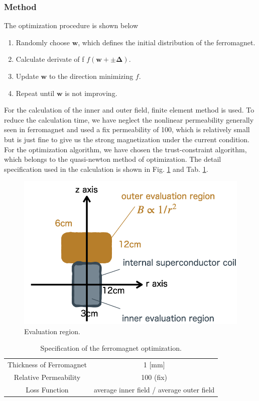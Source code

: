 \subsubsection{Method}
The optimization procedure is shown below
\begin{enumerate}
  \item Randomly choose $\mathbf{w}$, which defines the initial distribution of the ferromagnet.
  \item Calculate derivate of f $f(\mathbf{w+\pm \Delta})$.
  \item Update $\mathbf{w}$ to the direction minimizing $f$.
  \item Repeat until $\mathbf{w}$ is not improving.
\end{enumerate}
For the calculation of the inner and outer field,
finite element method is used.
To reduce the calculation time, we have neglect the nonlinear permeability generally seen in ferromagnet
and used a fix permeability of 100,
which is relatively small but is just fine to give us the strong magnetization under the current condition.
For the optimization algorithm, we have chosen the trust-constraint algorithm,
which belongs to the quasi-newton method of optimization.
The detail specification used in the calculation is shown in Fig. \ref{fig:FMEvaluationRegion} and Tab. \ref{tab:FMSpecification}.
\begin{figure}[H]
  \includegraphics[width=18cm, bb=9 9 900 600]{./section4Optimal/evaluationRegion.png}
  \caption{Evaluation region.}
  \label{fig:FMEvaluationRegion}
\end{figure}
\begin{table}[H]
  \centering
  \caption{Specification of the ferromagnet optimization.}
  \label{tab:FMSpecification}
  \begin{tabular}{cc}\hline\hline
    Thickness of Ferromagnet & 1 [mm]\\
    Relative Permeability & 100 (fix)\\
    Loss Function & average inner field / average outer field\\\hline\hline
  \end{tabular}
\end{table}


